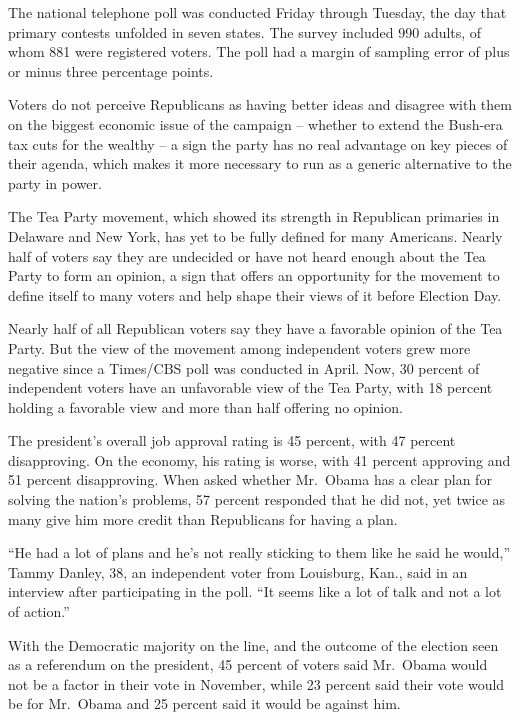 ﻿\documentclass[12pt]{article}
\begin{document}
The national telephone poll was conducted Friday through Tuesday, the day that primary contests
unfolded in seven states. The survey included 990 adults, of whom 881 were registered voters. The
poll had a margin of sampling error of plus or minus three percentage points.

Voters do not perceive Republicans as having better ideas and disagree with them on the biggest
economic issue of the campaign -- whether to extend the Bush-era tax cuts for the wealthy -- a sign
the party has no real advantage on key pieces of their agenda, which makes it more necessary to run
as a generic alternative to the party in power.

The Tea Party movement, which showed its strength in Republican primaries in Delaware and New York,
has yet to be fully defined for many Americans. Nearly half of voters say they are undecided or have
not heard enough about the Tea Party to form an opinion, a sign that offers an opportunity for the
movement to define itself to many voters and help shape their views of it before Election Day.

Nearly half of all Republican voters say they have a favorable opinion of the Tea Party. But the
view of the movement among independent voters grew more negative since a Times/CBS poll was
conducted in April. Now, 30 percent of independent voters have an unfavorable view of the Tea Party,
with 18 percent holding a favorable view and more than half offering no opinion.

The president's overall job approval rating is 45 percent, with 47 percent disapproving. On the
economy, his rating is worse, with 41 percent approving and 51 percent disapproving. When asked
whether Mr.~Obama has a clear plan for solving the nation's problems, 57 percent responded that he
did not, yet twice as many give him more credit than Republicans for having a plan.

``He had a lot of plans and he's not really sticking to them like he said he would,'' Tammy Danley,
38, an independent voter from Louisburg, Kan., said in an interview after participating in the poll.
``It seems like a lot of talk and not a lot of action.''

With the Democratic majority on the line, and the outcome of the election seen as a referendum on
the president, 45 percent of voters said Mr.~Obama would not be a factor in their vote in November,
while 23 percent said their vote would be for Mr.~Obama and 25 percent said it would be against him.
\end{document}
